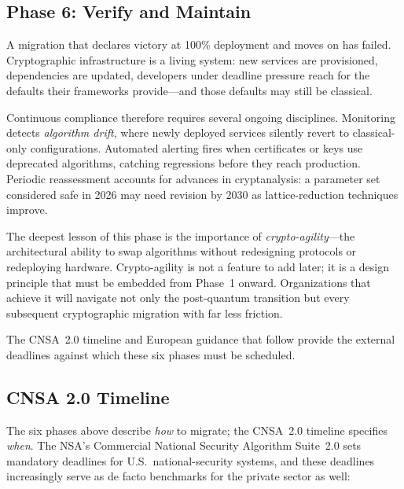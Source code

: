 \subsection{Phase 6: Verify and Maintain}
\label{subsec:phase-verify}

A migration that declares victory at 100\% deployment and moves on has failed.  Cryptographic infrastructure is a living system: new services are provisioned, dependencies are updated, developers under deadline pressure reach for the defaults their frameworks provide---and those defaults may still be classical.

Continuous compliance therefore requires several ongoing disciplines.  Monitoring detects \emph{algorithm drift}, where newly deployed services silently revert to classical-only configurations.  Automated alerting fires when certificates or keys use deprecated algorithms, catching regressions before they reach production.  Periodic reassessment accounts for advances in cryptanalysis: a parameter set considered safe in 2026 may need revision by 2030 as lattice-reduction techniques improve.

The deepest lesson of this phase is the importance of \emph{crypto-agility}---the architectural ability to swap algorithms without redesigning protocols or redeploying hardware.  Crypto-agility is not a feature to add later; it is a design principle that must be embedded from Phase~1 onward.  Organizations that achieve it will navigate not only the post-quantum transition but every subsequent cryptographic migration with far less friction.

The CNSA~2.0 timeline and European guidance that follow provide the external deadlines against which these six phases must be scheduled.

\subsection{CNSA 2.0 Timeline}
\label{subsec:cnsa20}

The six phases above describe \emph{how} to migrate; the CNSA~2.0 timeline specifies \emph{when}.  The NSA's Commercial National Security Algorithm Suite~2.0 sets mandatory deadlines for U.S.\ national-security systems, and these deadlines increasingly serve as de facto benchmarks for the private sector as well:

